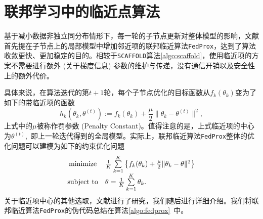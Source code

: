 \section{联邦学习中的临近点算法}
\label{sec:chap2-ppa}


基于减小数据非独立同分布情形下，每一轮的子节点更新对整体模型的影响，文献\parencite{sahu2018fedprox}首先提在子节点上的局部模型中增加邻近项的联邦临近算法\texttt{FedProx}，达到了算法收敛更快、更加稳定的目的。相较于\texttt{SCAFFOLD}算法\ref{algo:scaffold}，使用临近项的方案不需要进行额外 (关于梯度信息) 参数的维护与传递，没有通信开销以及安全性上的额外代价。

具体来说，在算法迭代的第$t+1$轮，每个子节点优化的目标函数从$f_k(\theta_k)$变为了如下的带临近项的函数
\begin{equation}
\label{eq:fedprox}
h_k(\theta_k, \theta^{(t)}) := f_k(\theta_k) + \frac{\mu}{2} \lVert \theta_k - \theta^{(t)} \rVert^2,
\end{equation}
上式中的$\mu$被称作罚参数 (Penalty Constant)。值得注意的是，上式临近项的中心为$\theta^{(t)},$ 即上一轮迭代得到的全局模型。实际上，联邦临近算法\texttt{FedProx}整体的优化问题可以建模为如下的约束优化问题
\begin{equation}
\label{eq:fedprox-whole}
\begin{array}{cl}
\operatorname*{minimize} & \frac{1}{K} \sum\limits_{k=1}^K \left\{ f_k(\theta_k) + \frac{\mu}{2} \lVert \theta_k - \theta \rVert^2 \right\} \\
\text{subject to} & \theta = \frac{1}{K} \sum\limits_{k=1}^K \theta_k.
\end{array}
\end{equation}
关于临近项中心的其他选取，文献\parencite{hanzely2020federated,li_2021_ditto}进行了研究，我们随后进行详细介绍。我们将联邦临近算法\texttt{FedProx}的伪代码总结在算法\ref{algo:fedprox}~中。



